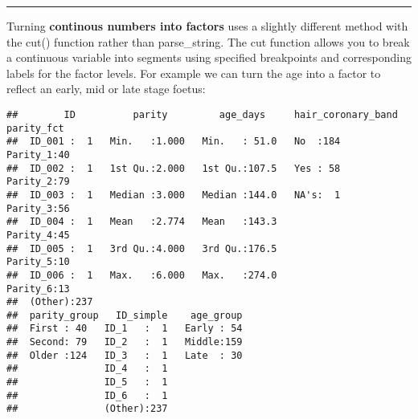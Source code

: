 \documentclass[
]{article}
\newenvironment{Shaded}{\begin{snugshade}}{\end{snugshade}}
\newcommand{\DataTypeTok}[1]{\textcolor[rgb]{0.13,0.29,0.53}{#1}}
\newcommand{\DecValTok}[1]{\textcolor[rgb]{0.00,0.00,0.81}{#1}}
\newcommand{\KeywordTok}[1]{\textcolor[rgb]{0.13,0.29,0.53}{\textbf{#1}}}
\newcommand{\NormalTok}[1]{#1}
\newcommand{\OperatorTok}[1]{\textcolor[rgb]{0.81,0.36,0.00}{\textbf{#1}}}
\newcommand{\StringTok}[1]{\textcolor[rgb]{0.31,0.60,0.02}{#1}}
\begin{document}
\begin{center}\rule{0.5\linewidth}{0.5pt}\end{center}

Turning \textbf{continous numbers into factors} uses a slightly
different method with the cut() function rather than parse\_string. The
cut function allows you to break a continuous variable into segments
using specified breakpoints and corresponding labels for the factor
levels. For example we can turn the age into a factor to reflect an
early, mid or late stage foetus:

\begin{Shaded}
\end{Shaded}

\begin{verbatim}
##        ID          parity         age_days     hair_coronary_band    parity_fct
##  ID_001 :  1   Min.   :1.000   Min.   : 51.0   No  :184           Parity_1:40  
##  ID_002 :  1   1st Qu.:2.000   1st Qu.:107.5   Yes : 58           Parity_2:79  
##  ID_003 :  1   Median :3.000   Median :144.0   NA's:  1           Parity_3:56  
##  ID_004 :  1   Mean   :2.774   Mean   :143.3                      Parity_4:45  
##  ID_005 :  1   3rd Qu.:4.000   3rd Qu.:176.5                      Parity_5:10  
##  ID_006 :  1   Max.   :6.000   Max.   :274.0                      Parity_6:13  
##  (Other):237                                                                   
##  parity_group   ID_simple    age_group  
##  First : 40   ID_1   :  1   Early : 54  
##  Second: 79   ID_2   :  1   Middle:159  
##  Older :124   ID_3   :  1   Late  : 30  
##               ID_4   :  1               
##               ID_5   :  1               
##               ID_6   :  1               
##               (Other):237
\end{verbatim}
\end{document}
